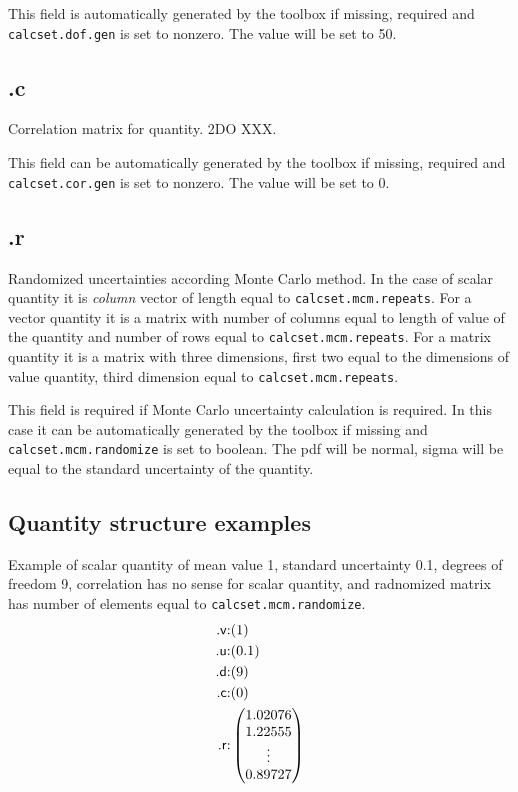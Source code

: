\documentclass[12pt,a4paper,oneside]{report} %
\begin{document}
This field is automatically generated by the toolbox if missing, required and \lstinline{calcset.dof.gen}
is set to nonzero. The value will be set to 50.

\subsection{\textsf{.c}} %
Correlation matrix for quantity. 2DO XXX.

This field can be automatically generated by the toolbox if missing, required and \lstinline{calcset.cor.gen}
is set to nonzero. The value will be set to 0.

\subsection{\textsf{.r}} %
Randomized uncertainties according Monte Carlo method. In the case of scalar quantity it is
\emph{column} vector of length equal to \lstinline{calcset.mcm.repeats}. For a vector quantity it is a matrix with number
of columns equal to length of value of the quantity and number of rows equal to
\lstinline{calcset.mcm.repeats}. For a matrix quantity it is a matrix with three dimensions, first
two equal to the dimensions of value quantity, third dimension equal to
\lstinline{calcset.mcm.repeats}.

This field is required if Monte Carlo uncertainty calculation is required. In this case it can be
automatically generated by the toolbox if missing and \lstinline{calcset.mcm.randomize} is set to
boolean. The pdf will be normal, sigma will be equal to the standard uncertainty of the quantity.

\subsection{Quantity structure examples} %
Example of scalar quantity of mean value 1, standard uncertainty 0.1, degrees of freedom 9, correlation has no
sense for scalar quantity, and radnomized matrix has number of elements equal to \lstinline{calcset.mcm.randomize}.
\begin{eqnarray*}
        \text{\textsf{.v}:} &(1)\\
        \text{\textsf{.u}:} &(0.1)\\
        \text{\textsf{.d}:} &(9)\\
        \text{\textsf{.c}:} &(0)\\
        \text{\textsf{.r}:} &\begin{pmatrix}
                1.02076 \\
                1.22555 \\
                \vdots\\
                0.89727 \\
        \end{pmatrix}\\
\end{eqnarray*}
\end{document}
